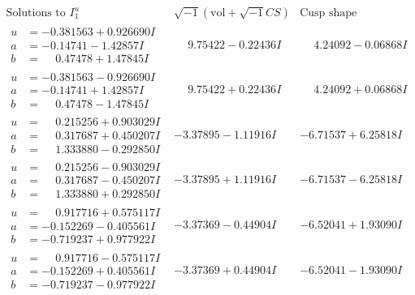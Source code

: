 \documentclass[1p]{elsarticle_modified}
\theoremstyle{definition}
\newcommand{\I}{\sqrt{-1}}
\begin{document}
$$\begin{array}{c|c|c}  
\text{Solutions to }I^u_{1}& \I (\text{vol} + \sqrt{-1}CS) & \text{Cusp shape}\\
 \hline 
\begin{aligned}
u &= -0.381563 + 0.926690 I \\
a &= -0.14741 - 1.42857 I \\
b &= \phantom{-}0.47478 + 1.47845 I\end{aligned}
 & \phantom{-}9.75422 - 0.22436 I & \phantom{-}4.24092 - 0.06868 I \\ \hline\begin{aligned}
u &= -0.381563 - 0.926690 I \\
a &= -0.14741 + 1.42857 I \\
b &= \phantom{-}0.47478 - 1.47845 I\end{aligned}
 & \phantom{-}9.75422 + 0.22436 I & \phantom{-}4.24092 + 0.06868 I \\ \hline\begin{aligned}
u &= \phantom{-}0.215256 + 0.903029 I \\
a &= \phantom{-}0.317687 + 0.450207 I \\
b &= \phantom{-}1.333880 - 0.292850 I\end{aligned}
 & -3.37895 - 1.11916 I & -6.71537 + 6.25818 I \\ \hline\begin{aligned}
u &= \phantom{-}0.215256 - 0.903029 I \\
a &= \phantom{-}0.317687 - 0.450207 I \\
b &= \phantom{-}1.333880 + 0.292850 I\end{aligned}
 & -3.37895 + 1.11916 I & -6.71537 - 6.25818 I \\ \hline\begin{aligned}
u &= \phantom{-}0.917716 + 0.575117 I \\
a &= -0.152269 - 0.405561 I \\
b &= -0.719237 + 0.977922 I\end{aligned}
 & -3.37369 - 0.44904 I & -6.52041 + 1.93090 I \\ \hline\begin{aligned}
u &= \phantom{-}0.917716 - 0.575117 I \\
a &= -0.152269 + 0.405561 I \\
b &= -0.719237 - 0.977922 I\end{aligned}
 & -3.37369 + 0.44904 I & -6.52041 - 1.93090 I \\ \hline\begin{aligned}

\end{aligned}
\end{array}$$
\end{document}
